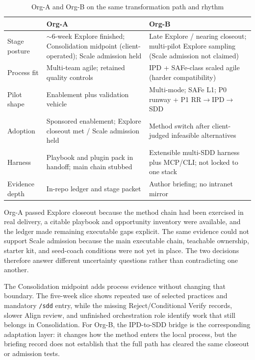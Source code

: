 \documentclass[10pt,conference]{IEEEtran}
\begin{document}
\begin{table}[t]
\caption{Org-A and Org-B on the same transformation path and rhythm}
\label{tab:a-b-contrast}
\centering
\footnotesize
\begin{tabularx}{\columnwidth}{@{}p{}X X@{}}
\toprule
 & \textbf{Org-A} & \textbf{Org-B} \\
\midrule
Stage posture & $\sim$6-week Explore finished; Consolidation midpoint (client-operated); Scale admission held & Late Explore / nearing closeout; multi-pilot Explore sampling (Scale admission not claimed) \\
Process fit & Multi-team agile; retained quality controls & IPD + SAFe-class scaled agile (harder compatibility) \\
Pilot shape & Enablement plus validation vehicle & Multi-mode; SAFe L1; P0 runway + P1 RR$\rightarrow$IPD$\rightarrow$SDD \\
Adoption & Sponsored enablement; Explore closeout met / Scale admission held & Method switch after client-judged infeasible alternatives \\
Harness & Playbook and plugin pack in handoff; main chain stubbed & Extensible multi-SDD harness plus MCP/CLI; not locked to one stack \\
Evidence depth & In-repo ledger and stage packet & Author briefing; no intranet mirror \\
\bottomrule
\end{tabularx}
\end{table}

Org-A passed Explore closeout because the method chain had been exercised in
real delivery, a citable playbook and opportunity inventory were available,
and the ledger made remaining executable gaps explicit.  The same evidence
could not support Scale admission because the main executable chain, teachable
ownership, starter kit, and seed-coach conditions were not yet in place.  The
two decisions therefore answer different uncertainty questions rather than
contradicting one another.

The Consolidation midpoint adds process evidence without changing that
boundary.  The five-week slice shows repeated use of selected practices and
mandatory \texttt{/sdd} entry, while the missing Reject/Conditional Verify
records, slower Align review, and unfinished orchestration role identify work
that still belongs in Consolidation.  For Org-B, the IPD-to-SDD bridge is the
corresponding adaptation layer: it changes how the method enters the local
process, but the briefing record does not establish that the full path has
cleared the same closeout or admission tests.
\end{document}
